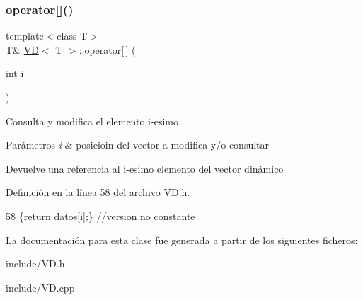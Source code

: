\subsubsection{\texorpdfstring{operator[]()}{operator[]()}}
{\footnotesize\ttfamily template$<$class T$>$ \\
T\& \hyperlink{classVD}{VD}$<$ T $>$\+::operator\mbox{[}$\,$\mbox{]} (\begin{DoxyParamCaption}\item[{int}]{i }\end{DoxyParamCaption})\hspace{0.3cm}{\ttfamily [inline]}}



Consulta y modifica el elemento i-\/esimo. 


\begin{DoxyParams}{Parámetros}
{\em i} & posicioin del vector a modifica y/o consultar \\
\hline
\end{DoxyParams}
\begin{DoxyReturn}{Devuelve}
una referencia al i-\/esimo elemento del vector dinámico 
\end{DoxyReturn}


Definición en la línea 58 del archivo V\+D.\+h.


\begin{DoxyCode}
58 \{\textcolor{keywordflow}{return} datos[i];\}  \textcolor{comment}{//version no constante}
\end{DoxyCode}


La documentación para esta clase fue generada a partir de los siguientes ficheros\+:\begin{DoxyCompactItemize}
\item 
include/V\+D.\+h\item 
include/V\+D.\+cpp\end{DoxyCompactItemize}
